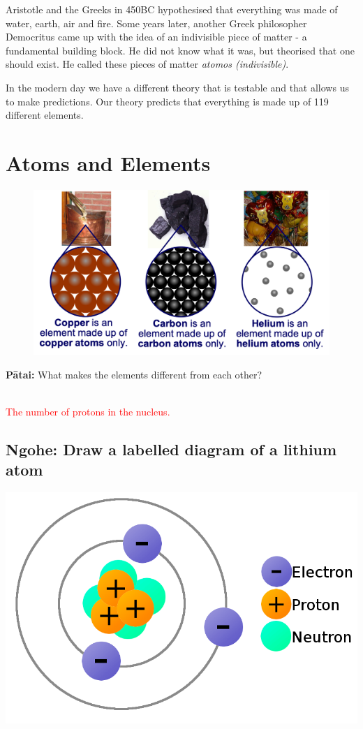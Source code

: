 \documentclass[12pt]{report}
\makeatletter
\DeclareRobustCommand{\StudentVSpace}[2]{%
	\ifthenelse{\boolean{@answer}}
	{\textcolor{red}{\\#1}}
	{\vspace{#2}}
}
\makeatother
\begin{document}
Aristotle and the Greeks in 450BC hypothesised that everything was made of water, earth, air and fire. Some years later, another Greek philosopher Democritus came up with the idea of an indivisible piece of matter - a fundamental building block. He did not know what it was, but theorised that one should exist. He called these pieces of matter \textit{atomos (indivisible)}.

In the modern day we have a different theory that is testable and that allows us to make predictions. Our theory predicts that everything is made up of 119 different elements.

\section{Atoms and Elements}

\begin{figure}
	\vspace{-1cm}
	\begin{center}
		\includegraphics[width=0.9\linewidth]{elements.png}
	\end{center}
\end{figure}

\textbf{Pātai:} What makes the elements different from each other?

\StudentVSpace{The number of protons in the nucleus.}{2cm}

\subsection{Ngohe: Draw a labelled diagram of a lithium atom}
{\includegraphics[width=0.3\linewidth]{lithium-atom.png}}
{}
\end{document}
